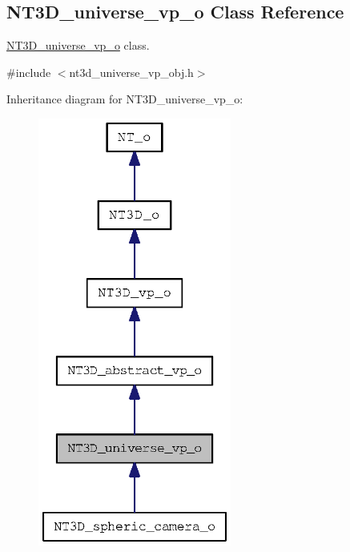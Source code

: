 \subsection{NT3D\_\-universe\_\-vp\_\-o Class Reference}
\label{class_n_t3_d__universe__vp__o}


\hyperlink{class_n_t3_d__universe__vp__o}{NT3D\_\-universe\_\-vp\_\-o} class.  




{\ttfamily \#include $<$nt3d\_\-universe\_\-vp\_\-obj.h$>$}



Inheritance diagram for NT3D\_\-universe\_\-vp\_\-o:
\nopagebreak
\begin{figure}[H]
\begin{center}
\leavevmode
\includegraphics[width=180pt]{class_n_t3_d__universe__vp__o__inherit__graph}
\end{center}
\end{figure}


